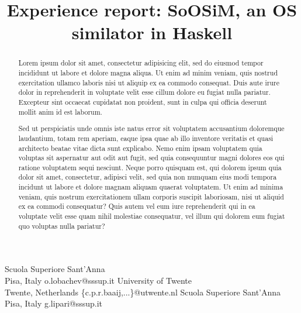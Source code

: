 \documentclass[preprint]{sigplanconf}
\newcommand{\soosim}{SoOSiM\xspace}
\begin{document}
\copyrightdata{[to be supplied]} 

\preprintfooter{\today}   %

\title{Experience report: \soosim, an OS similator in Haskell}

           {Scuola Superiore Sant'Anna\\Pisa, Italy}
           {o.lobachev@sssup.it}
           {University of Twente\\Twente, Netherlands}
           {\{c.p.r.baaij,...\}@utwente.nl}
           {Scuola Superiore Sant'Anna\\Pisa, Italy}
           {g.lipari@sssup.it}


\maketitle

\begin{abstract}
  Lorem ipsum dolor sit amet, consectetur adipisicing elit, sed do
  eiusmod tempor incididunt ut labore et dolore magna aliqua. Ut enim
  ad minim veniam, quis nostrud exercitation ullamco laboris nisi ut
  aliquip ex ea commodo consequat. Duis aute irure dolor in
  reprehenderit in voluptate velit esse cillum dolore eu fugiat nulla
  pariatur. Excepteur sint occaecat cupidatat non proident, sunt in
  culpa qui officia deserunt mollit anim id est laborum.


  Sed ut perspiciatis unde omnis iste natus error sit voluptatem
  accusantium doloremque laudantium, totam rem aperiam, eaque ipsa
  quae ab illo inventore veritatis et quasi architecto beatae vitae
  dicta sunt explicabo. Nemo enim ipsam voluptatem quia voluptas sit
  aspernatur aut odit aut fugit, sed quia consequuntur magni dolores
  eos qui ratione voluptatem sequi nesciunt. Neque porro quisquam est,
  qui dolorem ipsum quia dolor sit amet, consectetur, adipisci velit,
  sed quia non numquam eius modi tempora incidunt ut labore et dolore
  magnam aliquam quaerat voluptatem. Ut enim ad minima veniam, quis
  nostrum exercitationem ullam corporis suscipit laboriosam, nisi ut
  aliquid ex ea commodi consequatur? Quis autem vel eum iure
  reprehenderit qui in ea voluptate velit esse quam nihil molestiae
  consequatur, vel illum qui dolorem eum fugiat quo voluptas nulla
  pariatur?
\end{abstract}
\end{document}
